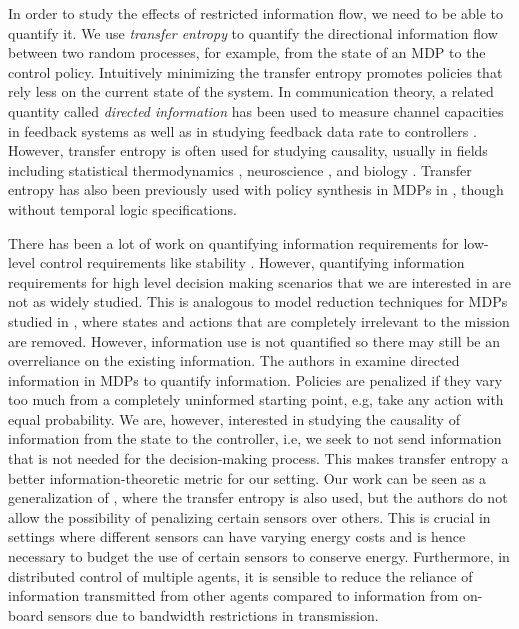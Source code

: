In order to study the effects of restricted information flow, we need to be able to quantify it. We use \emph{transfer entropy} \cite{schreiber2000} to quantify the directional information flow between two random processes, for example, from the state of an MDP to the control policy. Intuitively minimizing the transfer entropy promotes policies that rely less on the current state of the system. In communication theory, a related quantity called \emph{directed information} has been used to measure channel capacities in feedback systems \cite{massey1990causality,tatikonda2009capacity} as well as in studying feedback data rate to controllers \cite{silva2011achievable}. However, transfer entropy is often used for studying causality, usually in fields including statistical thermodynamics \cite{parrondo2015thermodynamics}, neuroscience \cite{vicente2011transfer}, and biology \cite{tung2007inferring}. Transfer entropy has also been previously used with policy synthesis in MDPs in \cite{takashi17}, though without temporal logic specifications. 

There has been a lot of work on quantifying information requirements for low-level control requirements like stability \cite{Nair07}. However, quantifying information requirements for high level decision making scenarios that we are interested in are not as widely studied. This is analogous to model reduction techniques for MDPs studied in \cite{Bharadwaj17,brazdil2014verification,ciesinski2008reduction}, where states and actions that are completely irrelevant to the mission are removed. However, information use is not quantified so there may still be an overreliance on the existing information. The authors in \cite{Tishby2011} examine directed information in MDPs to quantify information. Policies are penalized if they vary too much from a completely uninformed starting point, e.g, take any action with equal probability. We are, however, interested in studying the causality of information from the state to the controller, i.e, we seek to not send information that is not needed for the decision-making process. This makes transfer entropy a better information-theoretic metric for our setting. Our work can be seen as a generalization of \cite{takashi17}, where the transfer entropy is also used, but the authors do not allow the possibility of penalizing certain sensors over others. This is crucial in settings where different sensors can have varying energy costs and is hence necessary to budget the use of certain sensors to conserve energy. Furthermore, in distributed control of multiple agents, it is sensible to reduce the reliance of information transmitted from other agents compared to information from on-board sensors due to bandwidth restrictions in transmission.

